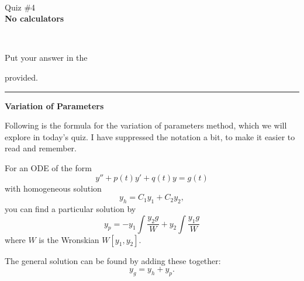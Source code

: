 \documentclass[12pt]{article}
\newcommand{\version}{}
\newcommand{\xzero}{}
\newcommand{\xone}{}
\newcommand{\xtwo}{}
\newcommand{\xthree}{}
\newcommand{\xfour}{}
\newcommand{\xfive}{}
\newcommand{\ExamName}{Quiz \#4\version}
\newenvironment{highlight}{\begin{mdframed}[backgroundcolor=gray!20]}{\end{mdframed}}
\begin{document}
\renewcommand{\version}{}
\renewcommand{\xzero}{0.0}
\renewcommand{\xone}{1.3}
\renewcommand{\xtwo}{2.9}
\renewcommand{\xthree}{4.1}
\renewcommand{\xfour}{5.3}
\renewcommand{\xfive}{6.5}
% 
\begin{minipage}{0.25\linewidth}
  \CourseName\ \Quarter \\
  \ExamName \\[1em]
  \textbf{No calculators}\\[2em]
\end{minipage}
\hfill
\begin{minipage}[t]{0.4\linewidth}
\end{minipage}
\hfill
\begin{minipage}{0.25\linewidth}
  \vspace*{-3.25em}
  \ \hfill
\end{minipage}
\vspace*{-0.25in}

Put your answer in the 
provided.
\hfill
\begin{minipage}{0.5\linewidth}

\end{minipage}
\noindent\hspace*{-2em}\rule{\textwidth+4em}{1pt}%

\mbox{}

{\large \textbf{Variation of Parameters}}

\bigskip
Following is the formula for the variation of parameters method, which we will explore in today's quiz. I have suppressed the notation a bit, to make it easier to read and remember. 

\begin{highlight}
For an ODE of the form 
$$y''+p(t)y'+q(t)y=g(t)$$
with homogeneous solution %
$$y_h=C_1y_1+C_2y_2,$$ 
you can find a particular solution by
$$y_p = -y_1\int\frac{y_2g}{W} + y_2\int\frac{y_1g}{W}$$
where $W$ is the Wronskian $W[y_1,y_2]$. 

\bigskip The general solution can be found by adding these together:
$$y_g=y_h+y_p.$$
\end{highlight}
\end{document}
